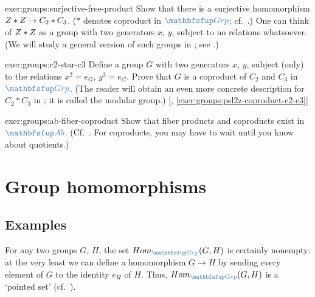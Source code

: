 \begin{exer}{}{exer:groups:surjective-free-product}
  Show that there is a surjective homomorphism
  $Z * Z \to C_2 * C_3$. ($*$ denotes coproduct in $\categ{Grp}$;
  cf.\ .) One can think of
  $Z * Z$ as a group with two generators $x$, $y$, subject to no
  relations whatsoever. (We will study a general version of such
  groups in ; see
  .)
\end{exer}

\begin{exer}{\exerused}{exer:groups:c2-star-c3}
  Define a group $G$ with two generators $x$, $y$, subject (only) to
  the relations $x^2 = e_G$, $y^3 = e_G$. Prove that $G$ is a
  coproduct of $C_2$ and $C_3$ in $\categ{Grp}$. (The reader will
  obtain an even more concrete description for $C_2 * C_3$ in
  ; it is called the modular
  group.)  [,
  \ref{exer:groups:psl2z-coproduct-c2-c3}]
\end{exer}

\begin{exer}{}{exer:groups:ab-fiber-coproduct}
  Show that fiber products and coproducts exist in $\categ{Ab}$. (Cf.\
  . For coproducts, you may have to
  wait until you know about quotients.)
\end{exer}

\section{Group homomorphisms}
\label{sec:groups:group-homomorphisms}


\subsection{Examples}
\label{subsec:groups:examples}
For any two groups $G$, $H$, the set $\Hom_{\categ{Grp}}(G,H)$ is
certainly nonempty: at the very least we can define a homomorphism
$G \to H$ by sending every element of $G$ to the identity $e_H$ of
$H$. Thus, $\Hom_{\categ{Grp}}(G,H)$ is a `pointed set' (cf.\
).

